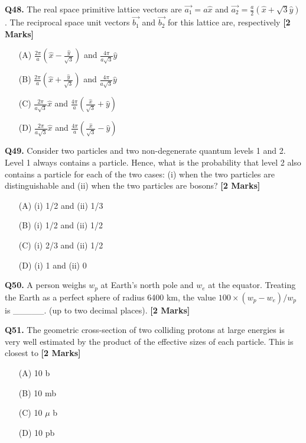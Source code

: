 \documentclass[11pt]{article}
\newcommand{\questionb}[2]{
    \noindent\textbf{Q#2.} #1 \hfill \textbf{[2 Marks]}
}
\begin{document}
\questionb{The real space primitive lattice vectors are \(\vec{a_1} = a \hat{x}\) and \(\vec{a_2} = \frac{a}{2} (\hat{x} + \sqrt{3} \hat{y})\). The reciprocal space unit vectors \(\vec{b_1}\) and \(\vec{b_2}\) for this lattice are, respectively}{48}
\begin{enumerate}
    \item[(A)] \( \frac{2\pi}{a} (\hat{x} - \frac{\hat{y}}{\sqrt{3}}) \) and \( \frac{4\pi}{a\sqrt{3}} \hat{y} \)
    \item[(B)] \( \frac{2\pi}{a} (\hat{x} + \frac{\hat{y}}{\sqrt{3}}) \) and \( \frac{4\pi}{a\sqrt{3}} \hat{y} \)
    \item[(C)] \( \frac{2\pi}{a\sqrt{3}} \hat{x} \) and \( \frac{4\pi}{a} (\frac{\hat{x}}{\sqrt{3}} + \hat{y}) \)
    \item[(D)] \( \frac{2\pi}{a\sqrt{3}} \hat{x} \) and \( \frac{4\pi}{a} (\frac{\hat{x}}{\sqrt{3}} - \hat{y}) \)
\end{enumerate}
\vspace{0.5cm}

\questionb{Consider two particles and two non-degenerate quantum levels 1 and 2. Level 1 always contains a particle. Hence, what is the probability that level 2 also contains a particle for each of the two cases: (i) when the two particles are distinguishable and (ii) when the two particles are bosons?}{49}
\begin{enumerate}
    \item[(A)] (i) 1/2 and (ii) 1/3
    \item[(B)] (i) 1/2 and (ii) 1/2
    \item[(C)] (i) 2/3 and (ii) 1/2
    \item[(D)] (i) 1 and (ii) 0
\end{enumerate}
\vspace{0.5cm}

\questionb{A person weighs \( w_p \) at Earth's north pole and \( w_e \) at the equator. Treating the Earth as a perfect sphere of radius 6400 km, the value \( 100 \times (w_p - w_e) / w_p \) is \_\_\_\_\_. (up to two decimal places).}{50}
\vspace{0.5cm}

\questionb{The geometric cross-section of two colliding protons at large energies is very well estimated by the product of the effective sizes of each particle. This is closest to}{51}
\begin{enumerate}
    \item[(A)] 10 b
    \item[(B)] 10 mb
    \item[(C)] 10 \(\mu\) b
    \item[(D)] 10 pb
\end{enumerate}
\vspace{0.5cm}
\end{document}
